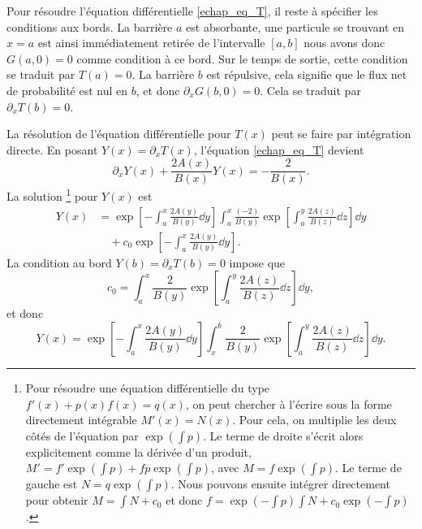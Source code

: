 \documentclass[openany,a4paper,12pt]{article}
\begin{document}
\par Pour résoudre l'équation différentielle \ref{echap_eq_T}, il reste à spécifier les conditions aux bords. La barrière $a$ est absorbante, une particule se trouvant en $x=a$ est ainsi immédiatement retirée de l'intervalle $[a,b]$ nous avons donc $G(a,0)=0$ comme condition à ce bord. Sur le temps de sortie, cette condition se traduit par $T(a)=0$. La barrière $b$ est répulsive, cela signifie que le flux net de probabilité est nul en $b$, et donc $\partial_x G(b,0) = 0$. Cela se traduit par $\partial_x T(b) = 0$.

\par La résolution de l'équation différentielle pour $T(x)$ peut se faire par intégration directe. En posant $Y(x) = \partial_x T(x)$, l'équation \ref{echap_eq_T} devient 
%
\begin{equation}\label{echap_eq_T_int_directe}
	\partial_x Y(x) + \frac{2A(x)}{B(x)} Y(x) = -\frac{2}{B(x)}.
\end{equation}
%
La solution
\footnote{
	Pour résoudre une équation différentielle du type $f'(x)+p(x)f(x)=q(x)$, on peut chercher à l'écrire sous la forme directement intégrable $M'(x) = N(x)$. Pour cela, on multiplie les deux côtés de l'équation par $\exp(\int p)$. Le terme de droite s'écrit alors explicitement comme la dérivée d'un produit, $M' = f'\exp(\int p) + f p \exp(\int p)$, avec $M = f\exp(\int p)$. Le terme de gauche est $N = q \exp(\int p)$. Nous pouvons ensuite intégrer directement pour obtenir $M = \int N + c_0$ et donc $f = \exp(-\int p) \int N + c_0 \exp(-\int p)$.
}
pour $Y(x)$ est 
%
\begin{equation}\label{echap_sol_Y_avec_c0}
\begin{split}
	Y(x) &= \exp\left[ - \int_a^x \frac{2 A(y)}{B(y)} \dd y \right]
	\int_a^x \frac{(-2)}{B(y)} \exp\left[ \int_a^y \frac{2 A(z)}{B(z)} \dd z\right] \dd y \\
	&\quad + c_0 \exp\left[ - \int_a^x \frac{2 A(y)}{B(y)} \dd y \right].
\end{split}	
\end{equation}
%
La condition au bord $Y(b)=\partial_x T(b)=0$ impose que 
%
\begin{equation}\label{echap_sol_Y_bord_b}
	c_0 = \int_a^x \frac{2}{B(y)} \exp\left[ \int_a^y \frac{2 A(z)}{B(z)} \dd z\right] \dd y,
\end{equation}
%
et donc
%
\begin{equation}\label{echap_sol_Y_sans_c0}
	Y(x) = \exp\left[ - \int_a^x \frac{2 A(y)}{B(y)} \dd y \right]
	\int_x^b \frac{2}{B(y)} \exp\left[ \int_a^y \frac{2 A(z)}{B(z)} \dd z\right] \dd y.
\end{equation}
\end{document}
